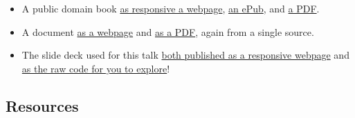\documentclass[
  letterpaper,
  DIV=11,
  numbers=noendperiod]{scrartcl}
\providecommand{\tightlist}{%
  \setlength{\itemsep}{0pt}\setlength{\parskip}{0pt}}\usepackage{longtable,booktabs,array}
\begin{document}
\begin{itemize}
\tightlist
\item
  A public domain book
  \href{https://ryanstraight.github.io/ac22-book}{as responsive a
  webpage},
  \href{https://ryanstraight.github.io/ac22-book/Quarto-ebook-demonstration.epub}{an
  ePub}, and
  \href{https://ryanstraight.github.io/ac22-book/Quarto-ebook-demonstration.pdf}{a
  PDF}.
\item
  A document
  \href{https://uaappcomp.github.io/apcv302/info/syllabus/index.html}{as
  a webpage} and
  \href{https://uaappcomp.github.io/apcv302/info/syllabus/APCV302_FA_22_7W1_Straight.pdf}{as
  a PDF}, again from a single source.
\item
  The slide deck used for this talk
  \href{https://ryanstraight.github.io/ac22-deck/}{both published as a
  responsive webpage} and
  \href{https://github.com/ryanstraight/ac22-deck/}{as the raw code for
  you to explore}!
\end{itemize}

\hypertarget{resources}{%
\subsection{Resources}\label{resources}}
\end{document}

